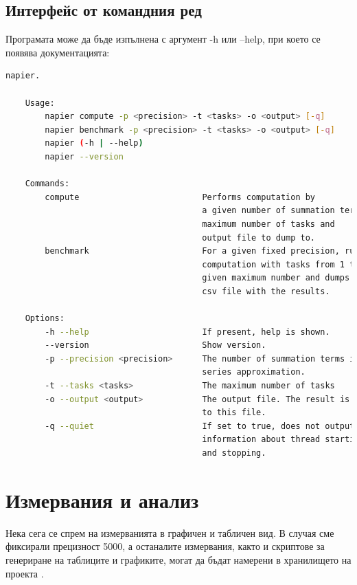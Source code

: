 \section{Интерфейс от командния ред}
Програмата може да бъде изпълнена с аргумент -h или --help, при което се появява документацията: 

\begin{lstlisting}[language=bash, caption=Помощно съобщение]
napier.

    Usage:
        napier compute -p <precision> -t <tasks> -o <output> [-q]
        napier benchmark -p <precision> -t <tasks> -o <output> [-q]
        napier (-h | --help)
        napier --version

    Commands:
        compute                         Performs computation by 
                                        a given number of summation terms,
                                        maximum number of tasks and
                                        output file to dump to.
        benchmark                       For a given fixed precision, runs
                                        computation with tasks from 1 to the 
                                        given maximum number and dumps
                                        csv file with the results.

    Options:
        -h --help                       If present, help is shown.
        --version                       Show version.
        -p --precision <precision>      The number of summation terms in the 
                                        series approximation.
        -t --tasks <tasks>              The maximum number of tasks
        -o --output <output>            The output file. The result is dumped 
                                        to this file.
        -q --quiet                      If set to true, does not output
                                        information about thread starting 
                                        and stopping.

\end{lstlisting}

\chapter{Измервания и анализ}
Нека сега се спрем на измерванията в графичен и табличен вид. В случая сме фиксирали прецизност 5000, а останалите измервания, както и скриптове за генериране на таблиците и графиките, могат да бъдат намерени в хранилището на проекта \cite{github-repo}.

